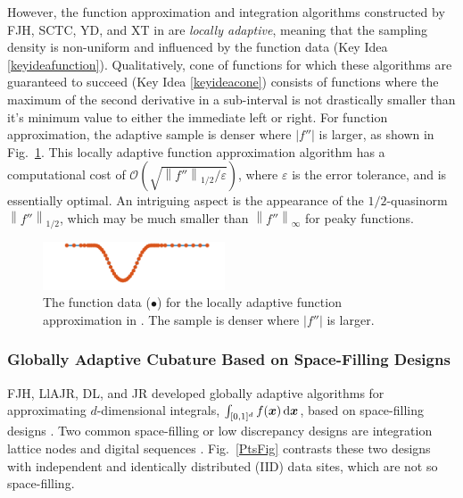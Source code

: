 \documentclass[11pt]{NSFamsart}
\newcommand{\bx}{{\boldsymbol{x}}}
\def\dif{\textup{d}}
\def\abs#1{\ensuremath{\left \lvert #1 \right \rvert}}
\newcommand{\norm}[2][{}]{\ensuremath{\left \lVert #2 \right \rVert}_{#1}}
\newcommand{\Order}{\mathcal{O}}
\begin{document}
However, the function approximation and integration algorithms constructed by FJH, SCTC, YD, and XT in \cite{ChoEtal17a} are \emph{locally adaptive}, meaning that the sampling density is non-uniform and influenced by the function data (Key Idea \ref{keyideafunction}).  Qualitatively, cone of functions for which these algorithms are guaranteed to succeed (Key Idea \ref{keyideacone}) consists of functions where the maximum of the second derivative in a sub-interval is not drastically smaller than it's minimum value to either the immediate left or right.  For function approximation, the adaptive sample is denser where $\abs{f''}$ is larger, as shown in Fig.\ \ref{localadaptfig}.  This locally adaptive function approximation algorithm has a computational cost of $\Order\left(\sqrt{\norm[1/2]{f''}/\varepsilon} \right)$, where $\varepsilon$ is the error tolerance, and is essentially optimal.  An intriguing aspect is the appearance of the $1/2$-quasinorm $\norm[1/2]{f''}$, which may be much smaller than 
$\norm[\infty]{f''}$ for peaky functions.

\begin{figure}[h]
	\centering
	\vspace{-1ex}
	\includegraphics[width = 0.48\textwidth]{ProgramsImages/sampling-funappxg.png}

	\vspace{-2ex}
	\caption{The function data ({\color{MATLABOrange}$\bullet$}) for the locally adaptive 
	function approximation in \cite{ChoEtal17a}.  The sample is denser where $\abs{f''}$ is larger. \label{localadaptfig}}
\end{figure}

\subsubsection[QMCsec]{Globally Adaptive Cubature Based on Space-Filling Designs} \hypertarget{QMClink}{}
\label{sec:QMC}
FJH, LlAJR, DL, and JR developed globally adaptive algorithms for approximating $d$-dimensional integrals,  $\int_{[0,1]^d} f(\bx) \, \dif \bx$, based on space-filling designs \cite{HicJim16a,HicEtal17a,JimHic16a}.  Two common space-filling or low discrepancy designs are integration lattice nodes and digital sequences \cite{DicEtal14a}.  Fig.\ \ref{PtsFig} contrasts these two designs with independent and identically distributed (IID) data sites, which are not so space-filling.
\end{document}
